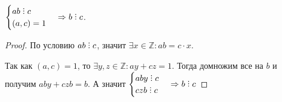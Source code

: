 \begin{lemma}
    $\begin{cases} ab \divby c \\ (a,c) = 1 \end{cases} \Rightarrow b \divby c$.
\end{lemma}
\begin{proof}
    \par 
    По условию $ab \divby c$, значит $\exists x \in \mathbb{Z}: ab = c \cdot x$.

    Так как $(a, c) = 1$, то $\exists y, z \in \mathbb{Z}: ay + cz = 1$. Тогда домножим все на $b$ и получим $aby + czb = b$. А значит $\begin{cases} aby \divby c \\ czb \divby c \end{cases} \Rightarrow b \divby c$
\end{proof}
